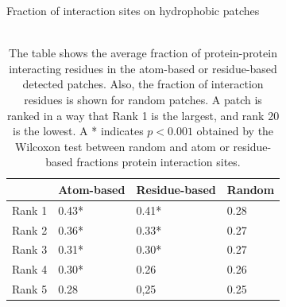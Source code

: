 \documentclass[11pt,a4paper]{article}
\begin{document}
\begin{table}[]
\centering
\caption{Fraction of interaction sites on hydrophobic patches}
\begin{tabular}{llll}
\hline
       & Atom-based & Residue-based & Random \\ \hline
Rank 1 & 0.43*                                         & 0.41*                                            & 0.28                                      \\
Rank 2 & 0.36*                                          & 0.33*                                            & 0.27                                      \\
Rank 3 & 0.31*                                          & 0.30*                                            & 0.27                                      \\
Rank 4 & 0.30*                                          & 0.26                                             & 0.26                                      \\
Rank 5 & 0.28                                          & 0,25                                             & 0.25                                      \\ \hline
\end{tabular}\\

\caption*{\\
The table shows the average fraction of protein-protein interacting residues in the atom-based or residue-based detected patches. Also, the fraction of interaction residues is shown for random patches. A patch is ranked in a way that Rank 1 is the largest, and rank 20 is the lowest. A * indicates $p<0.001$ obtained by the Wilcoxon test between random and atom or residue-based fractions protein interaction sites.}

\label{table1}
\end{table}
\end{document}
